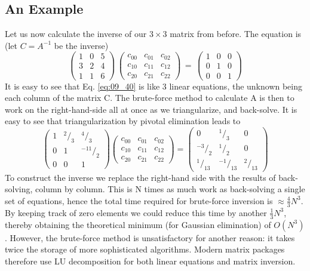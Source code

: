 \subsection{An Example} 
Let us now calculate the inverse of our $3\times 3$ matrix from before.
The equation is (let $C = A^{-1}$ be the inverse)
\begin{equation}
    \label{eq:09_40}
    \begin{pmatrix}
        1&0 &5\\ 
        3&2 &4\\ 
        1&1 &6
    \end{pmatrix}
    \,
    \begin{pmatrix}
        c_{00}&c_{01} &c_{02}\\ 
        c_{10}&c_{11} &c_{12}\\ 
        c_{20}&c_{21} &c_{22}
    \end{pmatrix}
    \, = \,
    \begin{pmatrix}
        1&0 &0\\ 
        0&1 &0\\ 
        0&0 &1
    \end{pmatrix}
\end{equation} 
It is easy to see that Eq. \ref{eq:09_40} is like 3 linear equations, the unknown being each column of the matrix C. The brute-force method to calculate A is then to work on the right-hand-side all at once as we triangularize, and back-solve. It is easy to see that triangularization by pivotal elimination leads to
\begin{equation}
    \label{eq:09_41}
    \begin{pmatrix}
        1&^2/_3 &^4/_3\\ 
        0&1 &^{-11}/_2\\ 
        0&0 &1
    \end{pmatrix}
    \begin{pmatrix}
        c_{00}&c_{01} &c_{02}\\ 
        c_{10}&c_{11} &c_{12}\\ 
        c_{20}&c_{21} &c_{22}
    \end{pmatrix}
    =
    \begin{pmatrix}
        0&^1/_3&0\\ 
        ^{-3}/_2 &^1/_2&0\\ 
         ^1/_{13} &         ^{-1}/_{13} &        ^2/_{13}
    \end{pmatrix}
\end{equation} 
To construct the inverse we replace the right-hand side with the results of back-solving, column by column. This is N times as much work as back-solving a single set of equations, hence the total time required for brute-force inversion is $\approx \frac{4}{3}N^3$. By keeping track of zero elements we could reduce this time by another $\frac{1}{3}N^3$, thereby obtaining the theoretical minimum (for Gaussian elimination) of $O(N^3)$. However, the brute-force method is unsatisfactory for another reason: it takes twice the storage of more sophisticated algorithms. Modern matrix packages therefore use LU decomposition for both linear equations and matrix inversion.

